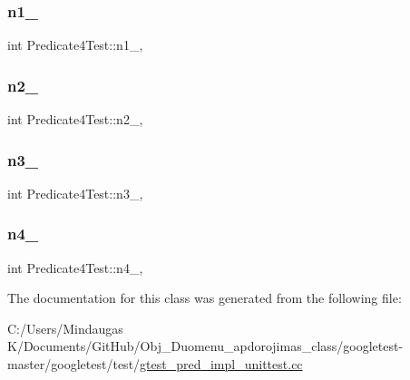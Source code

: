 \mbox{\label{class_predicate4_test_a8eb30cd283e613f7a2e501a3969be9ae}} 
\subsubsection{\texorpdfstring{n1\_}{n1\_}}
{\footnotesize\ttfamily int Predicate4\+Test\+::n1\+\_\+\hspace{0.3cm}{\ttfamily [static]}, {\ttfamily [protected]}}

\mbox{\label{class_predicate4_test_a088fce743c747e3851c926cb3a87fda3}} 
\subsubsection{\texorpdfstring{n2\_}{n2\_}}
{\footnotesize\ttfamily int Predicate4\+Test\+::n2\+\_\+\hspace{0.3cm}{\ttfamily [static]}, {\ttfamily [protected]}}

\mbox{\label{class_predicate4_test_a00ae6ae54c7d6639d448c036aedb6114}} 
\subsubsection{\texorpdfstring{n3\_}{n3\_}}
{\footnotesize\ttfamily int Predicate4\+Test\+::n3\+\_\+\hspace{0.3cm}{\ttfamily [static]}, {\ttfamily [protected]}}

\mbox{\label{class_predicate4_test_ae42e23ce11e3f1c6b813496d6180cc67}} 
\subsubsection{\texorpdfstring{n4\_}{n4\_}}
{\footnotesize\ttfamily int Predicate4\+Test\+::n4\+\_\+\hspace{0.3cm}{\ttfamily [static]}, {\ttfamily [protected]}}



The documentation for this class was generated from the following file\+:\begin{DoxyCompactItemize}
\item 
C\+:/\+Users/\+Mindaugas K/\+Documents/\+Git\+Hub/\+Obj\+\_\+\+Duomenu\+\_\+apdorojimas\+\_\+class/googletest-\/master/googletest/test/\mbox{\hyperlink{googletest-master_2googletest_2test_2gtest__pred__impl__unittest_8cc}{gtest\+\_\+pred\+\_\+impl\+\_\+unittest.\+cc}}\end{DoxyCompactItemize}
